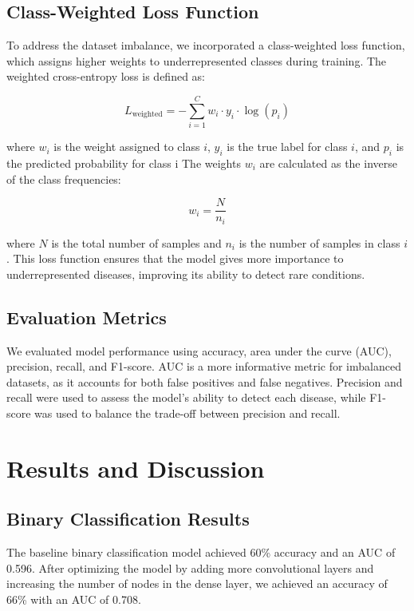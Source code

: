 \documentclass[conference]{IEEEtran}
\begin{document}
\subsection{Class-Weighted Loss Function}
To address the dataset imbalance, we incorporated a class-weighted loss function, which assigns higher weights to underrepresented classes during training. The weighted cross-entropy loss is defined as:

\begin{equation}
L_{\text{weighted}} = - \sum_{i=1}^{C} w_i \cdot y_i \cdot \log(p_i)
\end{equation}

where \( w_i \) is the weight assigned to class \( i \), \( y_i \) is the true label for class \( i \), and \( p_i \) is the predicted probability for class i The weights \( w_i \) are calculated as the inverse of the class frequencies:

\begin{equation}
w_i = \frac{N}{n_i}
\end{equation}

where \( N \) is the total number of samples and \( n_i \) is the number of samples in class \( i \). This loss function ensures that the model gives more importance to underrepresented diseases, improving its ability to detect rare conditions.

\subsection{Evaluation Metrics}
We evaluated model performance using accuracy, area under the curve (AUC), precision, recall, and F1-score. AUC is a more informative metric for imbalanced datasets, as it accounts for both false positives and false negatives. Precision and recall were used to assess the model's ability to detect each disease, while F1-score was used to balance the trade-off between precision and recall.

\section{Results and Discussion}

\subsection{Binary Classification Results}
The baseline binary classification model achieved 60\% accuracy and an AUC of 0.596. After optimizing the model by adding more convolutional layers and increasing the number of nodes in the dense layer, we achieved an accuracy of 66\% with an AUC of 0.708.
\end{document}
